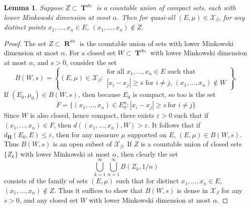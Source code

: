 \documentclass[12pt,reqno]{article}
\numberwithin{equation}{section}
\DeclareMathOperator{\RR}{\mathbf{R}}
\DeclareMathOperator{\TT}{\mathbf{T}}
\newtheorem{lemma}[theorem]{Lemma}
\numberwithin{theorem}{section}
\begin{document}
\begin{lemma} \label{LemmaVIVIJCIJSIJ}
    Suppose $Z \subset \TT^{dn}$ is a countable union of compact sets, each with lower Minkowski dimension at most $\alpha$. Then for quasi-all $(E,\mu) \in \mathcal{X}_\beta$, for any distinct points $x_1, \dots, x_n \in E$, $(x_1, \dots, x_n) \not \in Z$.
\end{lemma}
\begin{proof}
    The set $Z \subset \RR^{dn}$ is the countable union of sets with lower Minkowski dimension at most $\alpha$. For a closed set $W \subset \TT^{dn}$ with lower Minkowski dimension at most $\alpha$, and $s > 0$, consider the set
    \[ B(W,s) = \left\{ (E,\mu) \in \mathcal{X}_\beta: \begin{array}{c}
            \text{for all $x_1, \dots, x_n \in E$ such that}\\
            \text{$|x_i - x_j| \geq s$ for $i \neq j$, $(x_1, \dots, x_n) \not \in W$}
        \end{array} \right\}. \]
    If $(E_0,\mu_0) \in B(W,s)$, then because $E_0$ is compact, so too is the set
    \[ F = \{ (x_1,\dots,x_n) \in E_0^n : |x_i - x_j| \geq s\ \text{for $i \neq j$} \} \]
    Since $W$ is also closed, hence compact, there exists $\varepsilon > 0$ such that if $(x_1,\dots,x_n) \in F$, then $d((x_1,\dots,x_n),W) > \varepsilon$. It follows that if $d_\mathbf{H}(E_0,E) \leq \varepsilon$, then for any measure $\mu$ supported on $E$, $(E,\mu) \in B(W,s)$. Thus $B(W,s)$ is an open subset of $\mathcal{X}_\beta$. If $Z$ is a countable union of closed sets $\{ Z_k \}$ with lower Minkowski at most $\alpha$, then clearly the set
    \[ \bigcup_{k = 1}^\infty \bigcup_{n = 1}^\infty B(Z_k,1/n) \]
    consists of the family of sets $(E,\mu)$ such that for distinct $x_1, \dots, x_n \in E$, $(x_1, \dots, x_n) \not \in Z$. Thus it suffices to show that $B(W,s)$ is dense in $\mathcal{X}_\beta$ for any $s > 0$, and any closed set $W$ with lower Minkowski dimension at most $\alpha$.


\end{proof}
\end{document}
